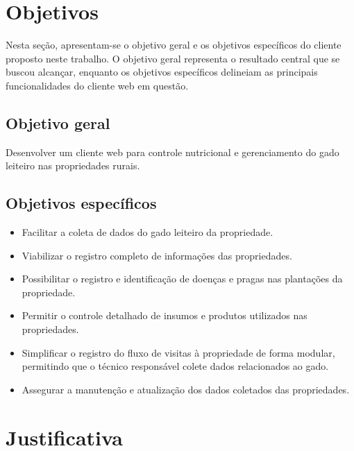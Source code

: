 \section{Objetivos}\label{sec:objetivos}

Nesta seção, apresentam-se o objetivo geral e os objetivos específicos do cliente proposto neste trabalho. O objetivo geral representa o resultado central que se buscou alcançar, enquanto os objetivos específicos delineiam as principais funcionalidades do cliente web em questão.

\subsection{Objetivo geral}\label{subsec:objetivoGeral}

Desenvolver um cliente web para controle nutricional e gerenciamento do gado leiteiro nas propriedades rurais.

\subsection{Objetivos específicos}\label{subsec:objetivosEspecificos}

\begin{itemize}
  \item Facilitar a coleta de dados do gado leiteiro da propriedade.

  \item Viabilizar o registro completo de informações das propriedades.

  \item Possibilitar o registro e identificação de doenças e pragas nas plantações da propriedade.

  \item Permitir o controle detalhado de insumos e produtos utilizados nas propriedades.

  \item Simplificar o registro do fluxo de visitas à propriedade de forma modular, permitindo que o técnico responsável colete dados relacionados ao gado.

  \item Assegurar a manutenção e atualização dos dados coletados das propriedades.
\end{itemize}

\section{Justificativa}\label{sec:justificativa}


